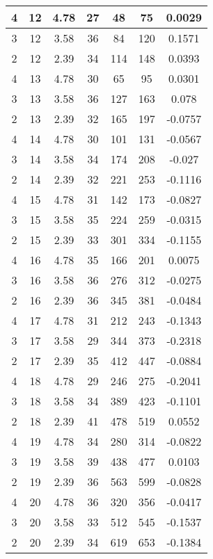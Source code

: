 \documentclass[letterpaper, 12pt]{article}
\begin{document}
\begin{longtable}{|c|c|c|c|c|c|c|}
\hline
4 & 12 & 4.78 & 27 & 48 & 75 & 0.0029 \\
\hline
3 & 12 & 3.58 & 36 & 84 & 120 & 0.1571 \\
\hline
2 & 12 & 2.39 & 34 & 114 & 148 & 0.0393 \\
\hline
4 & 13 & 4.78 & 30 & 65 & 95 & 0.0301 \\
\hline
3 & 13 & 3.58 & 36 & 127 & 163 & 0.078 \\
\hline
2 & 13 & 2.39 & 32 & 165 & 197 & -0.0757 \\
\hline
4 & 14 & 4.78 & 30 & 101 & 131 & -0.0567 \\
\hline
3 & 14 & 3.58 & 34 & 174 & 208 & -0.027 \\
\hline
2 & 14 & 2.39 & 32 & 221 & 253 & -0.1116 \\
\hline
4 & 15 & 4.78 & 31 & 142 & 173 & -0.0827 \\
\hline
3 & 15 & 3.58 & 35 & 224 & 259 & -0.0315 \\
\hline
2 & 15 & 2.39 & 33 & 301 & 334 & -0.1155 \\
\hline
4 & 16 & 4.78 & 35 & 166 & 201 & 0.0075 \\
\hline
3 & 16 & 3.58 & 36 & 276 & 312 & -0.0275 \\
\hline
2 & 16 & 2.39 & 36 & 345 & 381 & -0.0484 \\
\hline
4 & 17 & 4.78 & 31 & 212 & 243 & -0.1343 \\
\hline
3 & 17 & 3.58 & 29 & 344 & 373 & -0.2318 \\
\hline
2 & 17 & 2.39 & 35 & 412 & 447 & -0.0884 \\
\hline
4 & 18 & 4.78 & 29 & 246 & 275 & -0.2041 \\
\hline
3 & 18 & 3.58 & 34 & 389 & 423 & -0.1101 \\
\hline
2 & 18 & 2.39 & 41 & 478 & 519 & 0.0552 \\
\hline
4 & 19 & 4.78 & 34 & 280 & 314 & -0.0822 \\
\hline
3 & 19 & 3.58 & 39 & 438 & 477 & 0.0103 \\
\hline
2 & 19 & 2.39 & 36 & 563 & 599 & -0.0828 \\
\hline
4 & 20 & 4.78 & 36 & 320 & 356 & -0.0417 \\
\hline
3 & 20 & 3.58 & 33 & 512 & 545 & -0.1537 \\
\hline
2 & 20 & 2.39 & 34 & 619 & 653 & -0.1384 \\
\hline
\end{longtable}
\end{document}
